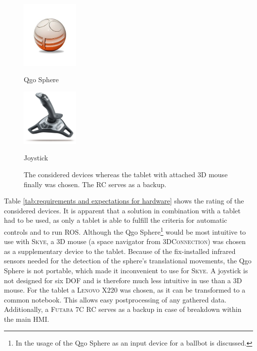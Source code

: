 \begin{figure}[h]
{\begin{center}
			\vspace{0.005\textwidth}
			\hspace{0.05\textwidth}			
			\parbox[b]{0.25\textwidth}{\includegraphics[width=0.25\textwidth]{qgo_sphere_cut}
			\begin{center}Qgo Sphere \end{center}}
			\hspace{0.05\textwidth}
			\parbox[b]{0.25\textwidth}{\includegraphics[width=0.25\textwidth]{Logitech-Freedom-Cordless-Joystick}
			\begin{center}Joystick \end{center}}
			\caption{The considered devices whereas the tablet with attached 3D mouse finally was chosen. The RC serves as a backup.}
			\label{fig:devices taken into consideration}	
		\end{center}
	}			
	\vspace{4.5mm}
\end{figure}

Table \ref{tab:requirements and expectations for hardware} shows the rating of the considered devices. It is apparent that a solution in combination with a tablet had to be used, as only a tablet is able to fulfill the criteria for automatic controls and to run \textsc{ROS}. Although the Qgo Sphere\footnote{In  \cite{kammermann} the usage of the Qgo Sphere as an input device for a ballbot is discussed.} would be most intuitive to use with \textsc{Skye}, a 3D mouse (a space navigator from \textsc{3DConnection}) was chosen as a supplementary device to the tablet. Because of the fix-installed infrared sensors needed for the detection of the sphere's translational movements, the Qgo Sphere is not portable, which made it inconvenient to use for \textsc{Skye}. A joystick is not designed for six DOF and is therefore much less intuitive in use than a 3D mouse. For the tablet a \textsc{Lenovo} X220 was chosen, as it can be transformed to a common notebook. This allows easy postprocessing of any gathered data. Additionally, a \textsc{Futaba} 7C RC serves as a backup in case of  breakdown within the main HMI.


